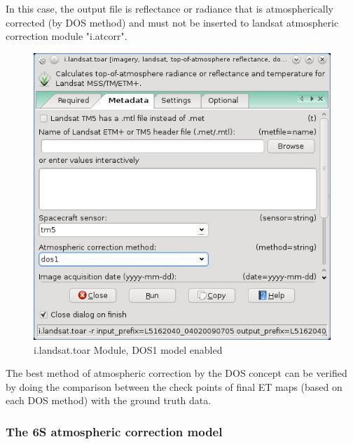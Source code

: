 In this case, the output file is reflectance or radiance that is atmospherically corrected (by DOS method) and must not be inserted to landsat atmospheric correction module "i.atcorr". \newline

\begin{figure}[htbp]
   \centering
   \includegraphics[scale=0.4]{gipe015.png}
   \caption{i.landsat.toar Module, DOS1 model enabled}
   \label{fig:gipe015}
\end{figure}

The best method of atmospheric correction by the DOS concept can be verified by doing the comparison between the check points of final ET maps (based on each DOS method) with the ground truth data.\newline

\subsubsection{The 6S atmospheric correction model}


